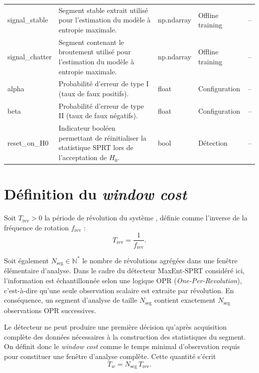 \documentclass[12pt,a4paper, openany]{book}
\begin{document}
\begin{longtable}{
        >{\ttfamily\small}p{2.7cm} 
        p{7.7cm} 
        >{\centering\arraybackslash}p{2.0cm} 
        >{\centering\arraybackslash}p{2.5cm} 
        >{\centering\arraybackslash}p{1.0cm}}
signal\_stable
& Segment stable extrait utilisé pour l'estimation du modèle à entropie maximale.
& np.ndarray & Offline training & -- \\

signal\_chatter
& Segment contenant le broutement utilisé pour l'estimation du modèle à entropie maximale.
& np.ndarray & Offline training & -- \\

alpha
& Probabilité d'erreur de type I (taux de faux positifs).
& float & Configuration & -- \\

beta
& Probabilité d'erreur de type II (taux de faux négatifs).
& float & Configuration & -- \\

reset\_on\_H0
& Indicateur booléen permettant de réinitialiser la statistique SPRT lors de l'acceptation de $H_0$.
& bool & Détection & -- \\

\end{longtable}


\section{Définition du \textit{window cost}}

Soit $T_{\mathrm{rev}} > 0$ la période de révolution du système , définie comme l'inverse de la fréquence de rotation $f_{\mathrm{rev}}$ :
\begin{equation}
T_{\mathrm{rev}} = \frac{1}{f_{\mathrm{rev}}}.
\end{equation}

Soit également $N_{\mathrm{seg}} \in \mathbb{N}^{*}$ le nombre de révolutions agrégées dans une fenêtre élémentaire d'analyse. Dans le cadre du détecteur MaxEnt-SPRT considéré ici, l'information est échantillonnée selon une logique OPR (\textit{One-Per-Revolution}), c'est-à-dire qu'une seule observation scalaire est extraite par révolution. En conséquence, un segment d'analyse de taille $N_{\mathrm{seg}}$ contient exactement $N_{\mathrm{seg}}$ observations OPR successives.
\medskip

Le détecteur ne peut produire une première décision qu'après acquisition complète des données nécessaires à la construction des statistiques du segment. On définit donc le \textit{window cost} comme le temps minimal d'observation requis pour constituer une fenêtre d'analyse complète. Cette quantité s'écrit
\begin{equation}
T_{w} = N_{\mathrm{seg}}\, T_{\mathrm{rev}}.
\label{eq:window_cost}
\end{equation}
\end{document}
